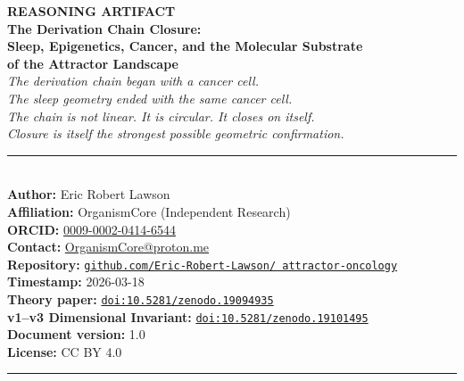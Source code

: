 \documentclass[10pt, a4paper]{article}
\begin{document}
\begin{center}
  {\LARGE\bfseries\color{headergreen}
  REASONING ARTIFACT}\\[0.4em]
  {\Large\bfseries
  The Derivation Chain Closure:}\\[0.3em]
  {\Large\bfseries
  Sleep, Epigenetics, Cancer, and the
  Molecular Substrate\\
  of the Attractor Landscape}\\[0.5em]
  {\normalsize\itshape
  The derivation chain began with a
  cancer cell.\\
  The sleep geometry ended with the
  same cancer cell.\\
  The chain is not linear. It is
  circular. It closes on itself.\\
  Closure is itself the strongest
  possible geometric confirmation.}\\[0.6em]
  \noindent\textcolor{rulecolor}
  {\rule{\linewidth}{1pt}}\\[0.4em]
  {\normalsize
  \textbf{Author:} Eric Robert Lawson\\
  \textbf{Affiliation:} OrganismCore
  (Independent Research)\\
  \textbf{ORCID:}
  \href{https://orcid.org/0009-0002-0414-6544}
  {0009-0002-0414-6544}\\
  \textbf{Contact:}
  \href{mailto:OrganismCore@proton.me}
  {OrganismCore@proton.me}\\
  \textbf{Repository:}
  \href{https://github.com/Eric-Robert-Lawson/attractor-oncology}
  {\texttt{github.com/Eric-Robert-Lawson/
  attractor-oncology}}\\
  \textbf{Timestamp:} 2026-03-18\\
  \textbf{Theory paper:}
  \href{https://doi.org/10.5281/zenodo.19094935}
  {\texttt{doi:10.5281/zenodo.19094935}}\\
  \textbf{v1--v3 Dimensional Invariant:}
  \href{https://doi.org/10.5281/zenodo.19101495}
  {\texttt{doi:10.5281/zenodo.19101495}}\\
  \textbf{Document version:} 1.0\\
  \textbf{License:} CC BY 4.0}\\[0.4em]
  \noindent\textcolor{rulecolor}
  {\rule{\linewidth}{1pt}}
\end{center}

\vspace{0.5em}
\end{document}
